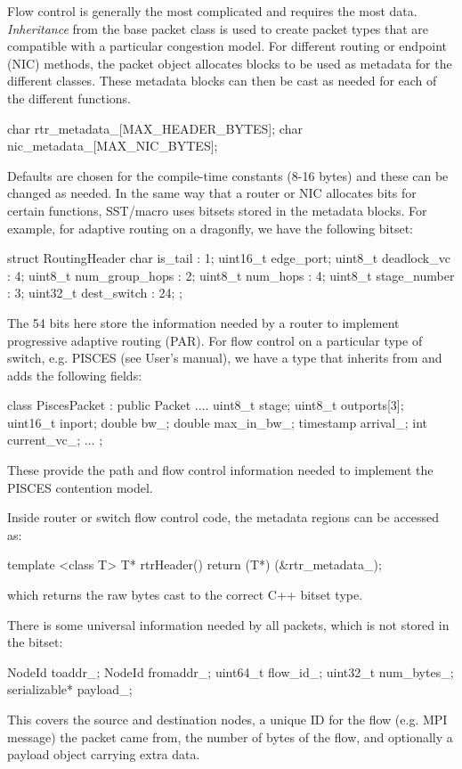 Flow control is generally the most complicated and requires the most data. 
\emph{Inheritance} from the base packet class is used to create packet types that are compatible with a particular congestion model.
For different routing or endpoint (NIC) methods, the packet object allocates blocks to be used as metadata for the different classes. 
These metadata blocks can then be cast as needed for each of the different functions.

\begin{CppCode}
char rtr_metadata_[MAX_HEADER_BYTES];
char nic_metadata_[MAX_NIC_BYTES];
\end{CppCode}
Defaults are chosen for the compile-time constants (8-16 bytes) and these can be changed as needed.
In the same way that a router or NIC allocates bits for certain functions, SST/macro uses bitsets stored in the metadata blocks.
For example, for adaptive routing on a dragonfly, we have the following bitset:

\begin{CppCode}
struct RoutingHeader  {
 char is_tail : 1;
 uint16_t edge_port; 
 uint8_t deadlock_vc : 4;
 uint8_t num_group_hops : 2;
 uint8_t num_hops : 4;
 uint8_t stage_number : 3;
 uint32_t dest_switch : 24;
};
\end{CppCode}
The 54 bits here store the information needed by a router to implement progressive adaptive routing (PAR). 
For flow control on a particular type of switch, e.g. PISCES (see User's manual), we have a type 
that inherits from  and adds the following fields:

\begin{CppCode}
class PiscesPacket : public Packet {
....
uint8_t stage;
uint8_t outports[3];
uint16_t inport;
double bw_;
double max_in_bw_;
timestamp arrival_;
int current_vc_;
...
};
\end{CppCode}
These provide the path and flow control information needed to implement the PISCES contention model.

Inside router or switch flow control code, the metadata regions can be accessed as:
\begin{CppCode}
template <class T>
T* rtrHeader()  {
  return (T*) (&rtr_metadata_);
}
\end{CppCode}
which returns the raw bytes cast to the correct C++ bitset type.

There is some universal information needed by all packets, which is not stored in the bitset:

\begin{CppCode}
NodeId toaddr_;
NodeId fromaddr_;
uint64_t flow_id_;
uint32_t num_bytes_;
serializable* payload_;
\end{CppCode}
This covers the source and destination nodes, a unique ID for the flow (e.g. MPI message) the packet came from, the number of bytes of the flow, and optionally a payload object carrying extra data.

